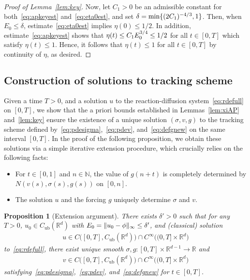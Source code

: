 \documentclass[12pt,oneside,a4paper,reqno]{amsart}
\numberwithin{equation}{section}
\newtheorem{proposition}[theorem]{Proposition}
\theoremstyle{definition}
\theoremstyle{remark}
\newcommand{\bbN}{{\mathbb N}}
\newcommand{\bbR}{{\mathbb R}}
\newcommand{\Cub}{{C_{\mathrm{ub}}}}
\DeclarePairedDelimiter{\norm}{\lVert}{\rVert}
\begin{document}
\begin{proof}[Proof of Lemma~\ref{lem:key}]
Now, let $C_1 > 0$ be an admissible constant for both~\eqref{eq:apkeyest} and~\eqref{eq:eta0est}, and set $\delta = \min\{\smash{(2C_1)^{-4/3}},1\}$.
Then, when $E_0 \leq \delta$, estimate~\eqref{eq:eta0est} implies $\eta(0) \leq 1/2$. In addition, estimate~\eqref{eq:apkeyest} shows that $\eta(t) \leq C_1 \smash{E_0^{3/4}} \leq 1/2$ for all $t \in [0,T]$ which satisfy $\eta(t) \leq 1$. Hence, it follows that $\eta(t) \leq 1$ for all $t \in [0,T]$ by continuity of $\eta$, as desired.
\end{proof}

\subsection{Construction of solutions to tracking scheme} \label{sec:extension}
Given a time $T>0$, and a solution $u$ to the reaction-diffusion system~\eqref{eq:rdefull} on $[0,T]$, we show that the a priori bounds established in Lemmas~\ref{lem:xiAP} and~\ref{lem:key} ensure the existence of a unique solution $(\sigma, v, g)$ to the tracking scheme defined by~\eqref{eq:pdesigma},~\eqref{eq:pdev}, and~\eqref{eq:defgnew} on the same interval $[0,T]$. In the proof of the following proposition, we obtain these solutions via a simple iterative extension procedure, which crucially relies on the following facts:
\begin{itemize}
    \item For $t\in[0,1]$ and $n\in\bbN$, the value of $g(n+t)$ is completely determined by $N(v(s),\sigma(s),g(s))$ on $[0,n]$.
    \item The solution $u$ and the forcing $g$ uniquely determine $\sigma$ and $v$.
\end{itemize}
\begin{proposition}[Extension argument]
    \label{prop:tracking}
There exists $\delta'> 0$ such that for any $T > 0$, $u_0 \in \Cub(\bbR^d)$ with $E_0 = \norm{u_0 - \phi}_\infty \leq \delta'$, and (classical) solution
\begin{align*}
 u \in C\big([0,T],\Cub(\bbR^d)\big) \cap C^\infty\big((0,T] \times \bbR^d\big)
\end{align*}
to~\eqref{eq:rdefull}, there exist unique smooth $\sigma,g \colon [0,T] \times \bbR^{d-1} \to \bbR$ and
\begin{align} \label{eq:vreg}
 v \in C\big([0,T],\Cub(\bbR^d)\big) \cap C^\infty\big((0,T] \times \bbR^d\big)
\end{align}
satisfying~\eqref{eq:pdesigma},~\eqref{eq:pdev}, and~\eqref{eq:defgnew} for $t \in [0,T]$.
\end{proposition}
\end{document}
